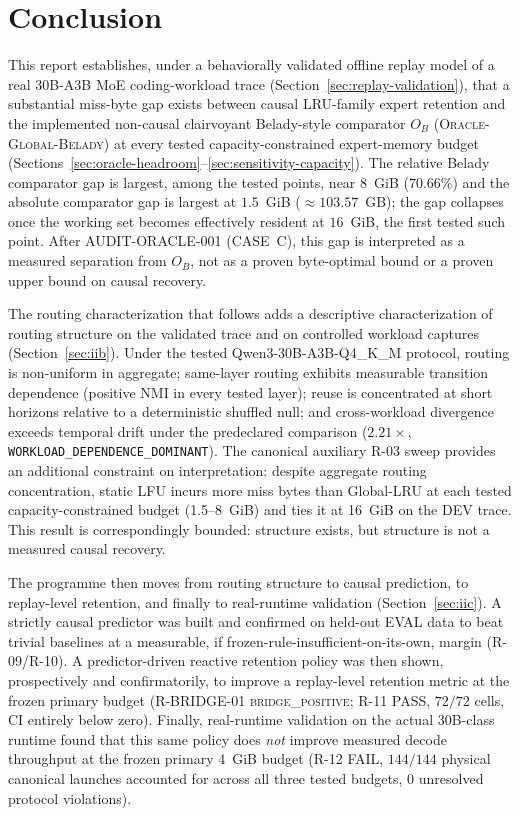 \section{Conclusion}
\label{sec:conclusion}

This report establishes, under a behaviorally validated offline replay
model of a real 30B-A3B MoE coding-workload trace
(Section~\ref{sec:replay-validation}), that a substantial miss-byte gap
exists between causal LRU-family expert retention and the implemented
non-causal clairvoyant Belady-style comparator $O_B$
(\textsc{Oracle-Global-Belady}) at every tested capacity-constrained
expert-memory budget (Sections~\ref{sec:oracle-headroom}--\ref{sec:sensitivity-capacity}). The
relative Belady comparator gap is largest, among the tested points, near
$8$~GiB ($70.66\%$) and the absolute comparator gap is largest at
$1.5$~GiB ($\approx 103.57$~GB); the gap collapses once the working set
becomes effectively resident at $16$~GiB, the first tested such point.
After \textsc{AUDIT-ORACLE-001} (CASE~C), this gap is interpreted as a
measured separation from $O_B$, not as a proven byte-optimal bound or a
proven upper bound on causal recovery.

The routing characterization that follows adds a descriptive characterization
of routing structure on the validated trace and on controlled workload captures
(Section~\ref{sec:iib}). Under the tested
Qwen3-30B-A3B-Q4\_K\_M protocol, routing is non-uniform in aggregate;
same-layer routing exhibits measurable transition dependence (positive NMI
in every tested layer); reuse is concentrated at short horizons relative to
a deterministic shuffled null; and cross-workload divergence exceeds
temporal drift under the predeclared comparison
($2.21\times$, \texttt{WORKLOAD\_DEPENDENCE\_DOMINANT}). The canonical
auxiliary R-03 sweep provides an additional constraint on interpretation:
despite aggregate routing concentration, static LFU incurs more miss bytes
than Global-LRU at each tested capacity-constrained budget (1.5--8~GiB)
and ties it at 16~GiB on the DEV trace. This result is correspondingly
bounded: structure exists, but structure is not a measured causal recovery.

The programme then moves from routing structure to causal prediction, to
replay-level retention, and finally to real-runtime validation
(Section~\ref{sec:iic}). A strictly causal predictor was built and
confirmed on held-out EVAL data to beat
trivial baselines at a measurable, if frozen-rule-insufficient-on-its-own,
margin (R-09/R-10). A predictor-driven reactive retention policy was then
shown, prospectively and confirmatorily, to improve a replay-level
retention metric at the frozen primary budget (R-BRIDGE-01
\textsc{bridge\_positive}; R-11 PASS, $72/72$ cells, CI
entirely below zero). Finally, real-runtime validation on the actual
30B-class runtime found that this same policy does \emph{not} improve
measured decode throughput at the frozen primary 4~GiB budget (R-12 FAIL,
$144/144$ physical canonical launches accounted for
across all three tested budgets, $0$ unresolved protocol violations).

